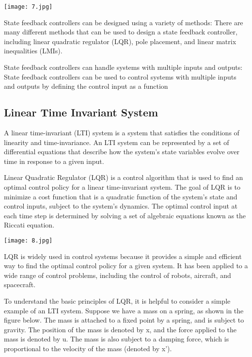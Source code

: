 \documentclass[12pt]{article}
\begin{document}
\texttt{[image: 7.jpg]}



State feedback controllers can be designed using a variety of methods: There are many different methods that can be used to design a state feedback controller, including linear quadratic regulator (LQR), pole placement, and linear matrix inequalities (LMIs).

State feedback controllers can handle systems with multiple inputs and outputs: State feedback controllers can be used to control systems with multiple inputs and outputs by defining the control input as a function
\subsection{Linear Time Invariant System}
A linear time-invariant (LTI) system is a system that satisfies the conditions of linearity and time-invariance. An LTI system can be represented by a set of differential equations that describe how the system's state variables evolve over time in response to a given input.

Linear Quadratic Regulator (LQR) is a control algorithm that is used to find an optimal control policy for a linear time-invariant system. The goal of LQR is to minimize a cost function that is a quadratic function of the system's state and control inputs, subject to the system's dynamics. The optimal control input at each time step is determined by solving a set of algebraic equations known as the Riccati equation.



\texttt{[image: 8.jpg]}



LQR is widely used in control systems because it provides a simple and efficient way to find the optimal control policy for a given system. It has been applied to a wide range of control problems, including the control of robots, aircraft, and spacecraft.



To understand the basic principles of LQR, it is helpful to consider a simple example of an LTI system. Suppose we have a mass on a spring, as shown in the figure below. The mass is attached to a fixed point by a spring, and is subject to gravity. The position of the mass is denoted by x, and the force applied to the mass is denoted by u. The mass is also subject to a damping force, which is proportional to the velocity of the mass (denoted by x').
\end{document}
